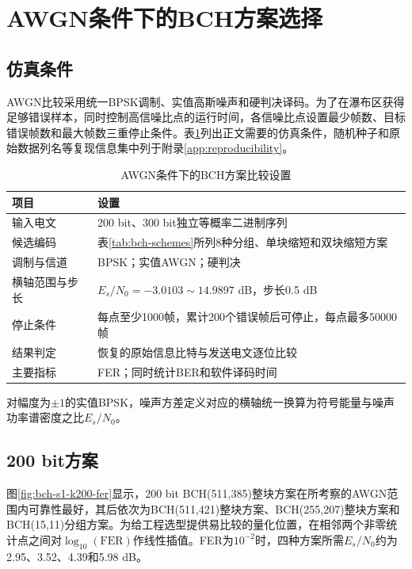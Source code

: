 \section{AWGN条件下的BCH方案选择}

\subsection{仿真条件}

AWGN比较采用统一BPSK调制、实值高斯噪声和硬判决译码。为了在瀑布区获得足够错误样本，同时控制高信噪比点的运行时间，各信噪比点设置最少帧数、目标错误帧数和最大帧数三重停止条件。表\ref{tab:bch-awgn-settings}列出正文需要的仿真条件，随机种子和原始数据列名等复现信息集中列于附录\ref{app:reproducibility}。

\begin{table}[htbp]
  \centering
  \small
  \caption{AWGN条件下的BCH方案比较设置}
  \label{tab:bch-awgn-settings}
  \begin{tabular}{p{}p{}}
    \toprule
    项目 & 设置 \\
    \midrule
    输入电文 & 200 bit、300 bit独立等概率二进制序列 \\
    候选编码 & 表\ref{tab:bch-schemes}所列8种分组、单块缩短和双块缩短方案 \\
    调制与信道 & BPSK；实值AWGN；硬判决 \\
    横轴范围与步长 & $E_s/N_0=-3.0103\sim14.9897$ dB，步长0.5 dB \\
    停止条件 & 每点至少1000帧，累计200个错误帧后可停止，每点最多50000帧 \\
    结果判定 & 恢复的原始信息比特与发送电文逐位比较 \\
    主要指标 & FER；同时统计BER和软件译码时间 \\
    \bottomrule
  \end{tabular}
\end{table}

对幅度为$\pm1$的实值BPSK，噪声方差定义对应的横轴统一换算为符号能量与噪声功率谱密度之比$E_s/N_0$。

\subsection{200 bit方案}

图\ref{fig:bch-s1-k200-fer}显示，200 bit BCH(511,385)整块方案在所考察的AWGN范围内可靠性最好，其后依次为BCH(511,421)整块方案、BCH(255,207)整块方案和BCH(15,11)分组方案。为给工程选型提供易比较的量化位置，在相邻两个非零统计点之间对$\log_{10}(\mathrm{FER})$作线性插值。FER为$10^{-2}$时，四种方案所需$E_s/N_0$约为2.95、3.52、4.39和5.98 dB。

